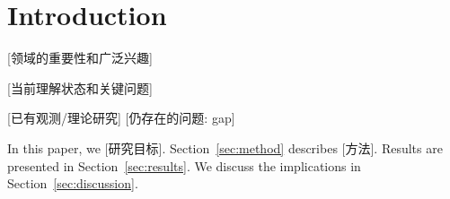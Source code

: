 
\section{Introduction}

[领域的重要性和广泛兴趣]
\citep{ref1, ref2}

[当前理解状态和关键问题]
\citep{ref3, ref4}

[已有观测/理论研究]
[仍存在的问题: gap]

In this paper, we [研究目标].
Section~\ref{sec:method} describes [方法].
Results are presented in Section~\ref{sec:results}.
We discuss the implications in Section~\ref{sec:discussion}.
